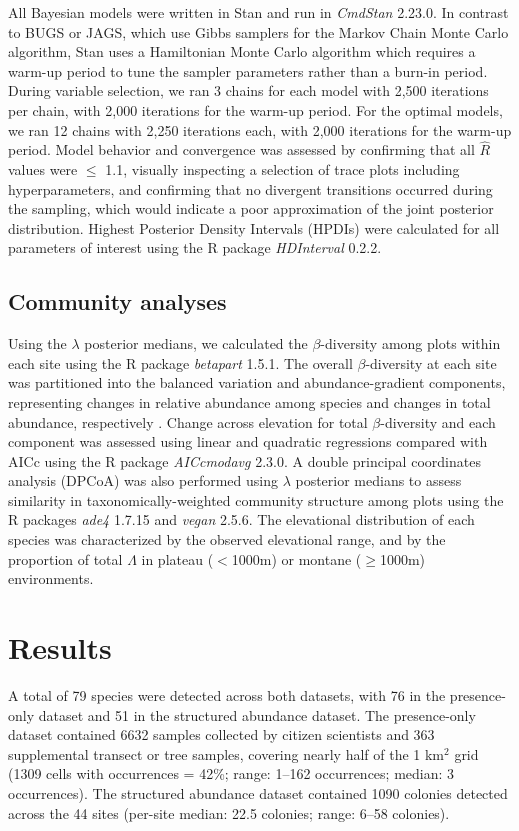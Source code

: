 \documentclass[preprint,review,times,12pt]{elsarticle}
\begin{document}
All Bayesian models were written in Stan \citep{Carpenter2017} and run in \emph{CmdStan} 2.23.0. In contrast to BUGS or JAGS, which use Gibbs samplers for the Markov Chain Monte Carlo algorithm, Stan uses a Hamiltonian Monte Carlo algorithm which requires a warm-up period to tune the sampler parameters rather than a burn-in period. During variable selection, we ran 3 chains for each model with 2,500 iterations per chain, with 2,000 iterations for the warm-up period. For the optimal models, we ran 12 chains with 2,250 iterations each, with 2,000 iterations for the warm-up period. Model behavior and convergence was assessed by confirming that all $\hat{R}$ values were $\leq$ 1.1, visually inspecting a selection of trace plots including hyperparameters, and confirming that no divergent transitions occurred during the sampling, which would indicate a poor approximation of the joint posterior distribution. Highest Posterior Density Intervals (HPDIs) were calculated for all parameters of interest using the R package \emph{HDInterval} 0.2.2.


\subsection{Community analyses}
Using the $\lambda$ posterior medians, we calculated the $\beta$-diversity among plots within each site using the R package \emph{betapart} 1.5.1. The overall $\beta$-diversity at each site was partitioned into the balanced variation and abundance-gradient components, representing changes in relative abundance among species and changes in total abundance, respectively \citep{Baselga2017}. Change across elevation for total $\beta$-diversity and each component was assessed using linear and quadratic regressions compared with AICc using the R package \emph{AICcmodavg} 2.3.0. A double principal coordinates analysis (DPCoA) was also performed using $\lambda$ posterior medians to assess similarity in taxonomically-weighted community structure among plots \citep{Dray2015,Pavoine2019} using the R packages \emph{ade4} 1.7.15 and \emph{vegan} 2.5.6. The elevational distribution of each species was characterized by the observed elevational range, and by the proportion of total $\Lambda$ in plateau ($<$1000m) or montane ($\geq$1000m) environments.




\section{Results}
\label{S:3}
A total of 79 species were detected across both datasets, with 76 in the presence-only dataset and 51 in the structured abundance dataset. The presence-only dataset contained 6632 samples collected by citizen scientists and 363 supplemental transect or tree samples, covering nearly half of the 1 km$^2$ grid (1309 cells with occurrences = 42\%; range: 1–162 occurrences; median: 3 occurrences). The structured abundance dataset contained 1090 colonies detected across the 44 sites (per-site median: 22.5 colonies; range: 6–58 colonies). 
\end{document}
